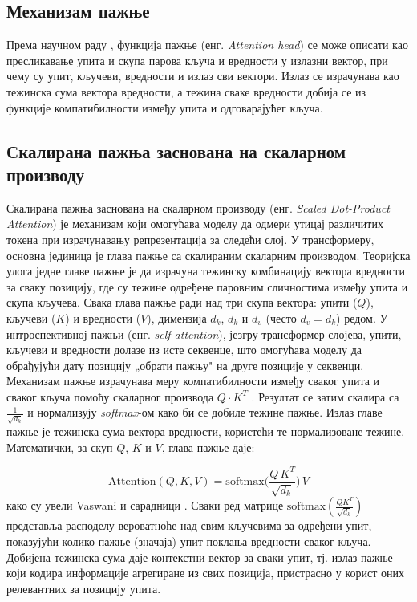 \subsection{Механизам пажње}

Према научном раду \cite{vaswani_attention_2017}, функција пажње (енг. \textit{Attention head}) се може описати као пресликавање упита и скупа парова кључа и вредности у излазни вектор, при чему су упит, кључеви, вредности и излаз сви вектори. Излаз се израчунава као тежинска сума вектора вредности, а тежина сваке вредности добија се из функције компатибилности између упита и одговарајућег кључа.

\subsection{Скалирана пажња заснована на скаларном производу}

Скалирана пажња заснована на скаларном производу (енг. \textit{Scaled Dot-Product Attention}) је механизам који омогућава моделу да одмери утицај различитих токена при израчунавању репрезентација за следећи слој. У трансформеру, основна јединица је глава пажње са скалираним скаларним производом. Теоријска улога једне главе пажње је да израчуна тежинску комбинацију вектора вредности за сваку позицију, где су тежине одређене паровним сличностима између упита и скупа кључева. Свака глава пажње ради над три скупа вектора: упити ($Q$), кључеви ($K$) и вредности ($V$), димензија $d_k$, $d_k$ и $d_v$ (често $d_v = d_k$) редом. У интроспективној пажњи (енг. \textit{self-attention}), језгру трансформер слојева, упити, кључеви и вредности долазе из исте секвенце, што омогућава моделу да обрађујући дату позицију „обрати пажњу" на друге позиције у секвенци. Механизам пажње израчунава меру компатибилности између сваког упита и сваког кључа помоћу скаларног производа $Q \cdot K^T$ \cite{vaswani_attention_2017}. Резултат се затим скалира са $\frac{1}{\sqrt{d_k}}$ и нормализују \textit{softmax}-ом како би се добиле тежине пажње. Излаз главе пажње је тежинска сума вектора вредности, користећи те нормализоване тежине. Математички, за скуп $Q$, $K$ и $V$, глава пажње даје:
\newline

\begin{equation}
\text{Attention}(Q, K, V) = \text{softmax}\!\Big( \frac{Q\,K^T}{\sqrt{d_k}}\Big)\,V
\label{eq:attention}
\end{equation}
\newline
\newline
како су увели Vaswani и сарадници \cite{vaswani_attention_2017}. Сваки ред матрице $\text{softmax}(\frac{QK^T}{\sqrt{d_k}})$ представља расподелу вероватноће над свим кључевима за одређени упит, показујући колико пажње (значаја) упит поклања вредности сваког кључа. Добијена тежинска сума даје контекстни вектор за сваки упит, тј. излаз пажње који кодира информације агрегиране из свих позиција, пристрасно у корист оних релевантних за позицију упита.
\newline

